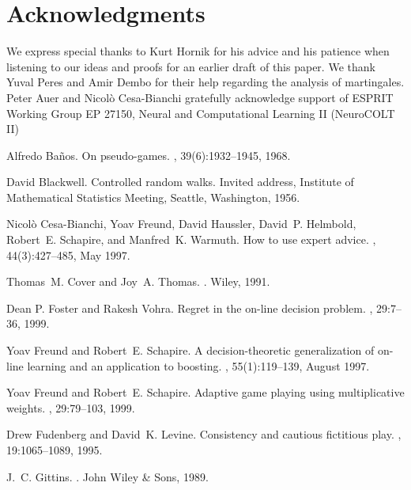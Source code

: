 \documentclass[12pt]{article}
\begin{document}
\section*{Acknowledgments} We express special thanks to Kurt Hornik
for his advice and his patience when listening to our ideas and proofs
for an earlier draft of this paper. We thank Yuval
Peres and Amir Dembo for their help regarding the analysis of martingales.
Peter Auer and Nicol\`o Cesa-Bianchi gratefully
acknowledge support of ESPRIT Working Group EP 27150,
Neural and Computational Learning II (NeuroCOLT II)

\begin{thebibliography}{10}

Alfredo Ba{\~{n}}os.
\newblock On pseudo-games.
, 39(6):1932--1945, 1968.

David Blackwell.
\newblock Controlled random walks.
\newblock Invited address, Institute of Mathematical Statistics Meeting,
  Seattle, Washington, 1956.

Nicol{\`o} Cesa-Bianchi, Yoav Freund, David Haussler, David~P. Helmbold,
  Robert~E. Schapire, and Manfred~K. Warmuth.
\newblock How to use expert advice.
,
  44(3):427--485, May 1997.

Thomas~M. Cover and Joy~A. Thomas.
.
\newblock Wiley, 1991.

Dean P. Foster and Rakesh Vohra.
\newblock Regret in the on-line decision problem.
, 29:7--36, 1999.

Yoav Freund and Robert~E. Schapire.
\newblock A decision-theoretic generalization of on-line learning and an
  application to boosting.
, 55(1):119--139, August
  1997.

Yoav Freund and Robert~E. Schapire.
\newblock Adaptive game playing using multiplicative weights.
, 29:79--103, 1999.

Drew Fudenberg and David~K. Levine.
\newblock Consistency and cautious fictitious play.
, 19:1065--1089, 1995.

J.~C. Gittins.
.
\newblock John Wiley \& Sons, 1989.


\end{thebibliography}
\end{document}

